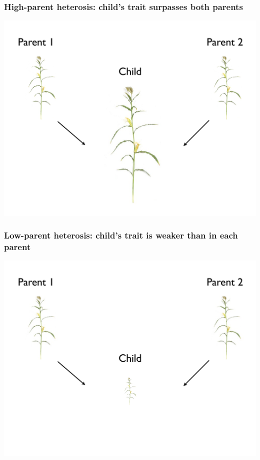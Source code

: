 \documentclass[handout]{beamer}
\numberwithin{equation}{section}
\begin{document}
\begin{frame}
\frametitle{High-parent heterosis: child's trait surpasses both parents}
\begin{center}
\includegraphics[scale=.3]{fig/hph}
\end{center}
\end{frame}


\begin{frame}
\frametitle{Low-parent heterosis: child's trait is weaker than in each parent}
\begin{center}
\includegraphics[scale=.3]{fig/lph}
\end{center}
\end{frame}
\end{document}
